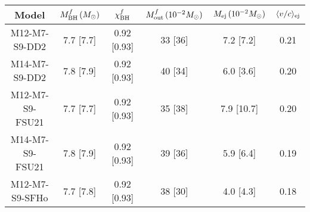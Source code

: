\begin{tabular}{c cc ccc}
	\toprule \toprule
	Model & $M_{\rm BH}^f\,(M_\odot)$ & $\chi_{\rm BH}^f$ & $M_{\rm out}^f\,(10^{-2} M_\odot)$ & $M_{\rm ej}\,(10^{-2} M_\odot)$ & $\langle v/c \rangle_{\rm ej}$\\
	\midrule
	M12-M7-S9-DD2 & 7.7 [7.7] & 0.92 [0.93] & 33 [36] & 7.2 [7.2] & 0.21\\
	M14-M7-S9-DD2 & 7.8 [7.9] & 0.92 [0.93] & 40 [34] & 6.0 [3.6] & 0.20\\
	M12-M7-S9-FSU21 & 7.7 [7.7] & 0.92 [0.93] & 35 [38] & 7.9 [10.7] & 0.20\\
	M14-M7-S9-FSU21 & 7.8 [7.9] & 0.92 [0.93] & 39 [36] & 5.9 [6.4] & 0.19\\
	M12-M7-S9-SFHo & 7.7 [7.8] & 0.92 [0.93] & 38 [30] &  4.0 [4.3] & 0.18\\
	\bottomrule \bottomrule
\end{tabular}